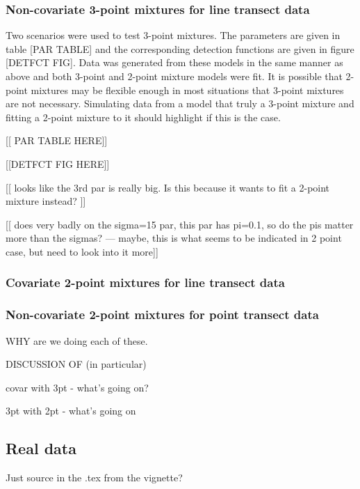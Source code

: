 \subsubsection{Non-covariate 3-point mixtures for line transect data}

Two scenarios were used to test 3-point mixtures. The parameters are given in table [PAR TABLE] and the corresponding detection functions are given in figure [DETFCT FIG]. Data was generated from these models in the same manner as above and both 3-point and 2-point mixture models were fit. It is possible that 2-point mixtures may be flexible enough in most situations that 3-point mixtures are not necessary. Simulating data from a model that truly a 3-point mixture and fitting a 2-point mixture to it should highlight if this is the case.


[[ PAR TABLE HERE]]

[[DETFCT FIG HERE]]

[[ looks like the 3rd par is really big. Is this because it wants to fit a 2-point mixture instead? ]]

[[ does very badly on the sigma=15 par, this par has pi=0.1, so do the pis matter more than the sigmas? --- maybe, this is what seems to be indicated in 2 point case, but need to look into it more]]



\subsubsection{Covariate 2-point mixtures for line transect data}


\subsubsection{Non-covariate 2-point mixtures for point transect data}


WHY are we doing each of these.

DISCUSSION OF (in particular)



covar with 3pt - what's going on?

3pt with 2pt - what's going on





\subsection{Real data}

Just source in the .tex from the vignette?




